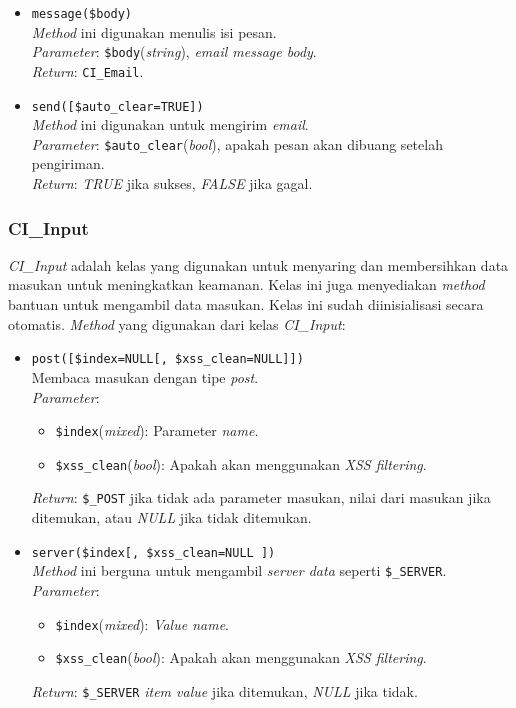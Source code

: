 \begin{itemize}
	\item \texttt{message(\$body)} \\
	\textit{Method} ini digunakan menulis isi pesan. \\
	\textit{Parameter}: \texttt{\$body}(\textit{string}), \textit{email message body}. \\
	\textit{Return}: \texttt{CI\_Email}.
	
	\item \texttt{send([\$auto\_clear=TRUE])} \\
	\textit{Method} ini digunakan untuk mengirim \textit{email}. \\
	\textit{Parameter}: \texttt{\$auto\_clear}(\textit{bool}), apakah pesan akan dibuang setelah pengiriman. \\
	\textit{Return}: \textit{TRUE} jika sukses, \textit{FALSE} jika gagal.
	
	
\end{itemize}

\subsubsection{CI\_Input}
\textit{CI\_Input} adalah kelas yang digunakan untuk menyaring dan membersihkan data masukan untuk meningkatkan keamanan. Kelas ini juga menyediakan \textit{method} bantuan untuk mengambil data masukan. Kelas ini sudah diinisialisasi secara otomatis. \textit{Method} yang digunakan dari kelas \textit{CI\_Input}:
\begin{itemize}
	\item \texttt{post([\$index=NULL[, \$xss\_clean=NULL]])} \\
	Membaca masukan dengan tipe \textit{post}. \\
	\textit{Parameter}:
	\begin{itemize}
		\item \texttt{\$index}(\textit{mixed}): Parameter \textit{name}.
		\item \texttt{\$xss\_clean}(\textit{bool}): Apakah akan menggunakan \textit{XSS filtering}.
	\end{itemize}
	\textit{Return}: \texttt{\$\_POST} jika tidak ada parameter masukan, nilai dari masukan jika ditemukan, atau \textit{NULL} jika tidak ditemukan.
	
	\item \texttt{server(\$index[, \$xss\_clean=NULL ])} \\ 
	\textit{Method} ini berguna untuk mengambil \textit{server data} seperti \texttt{\$\_SERVER}. \\
	\textit{Parameter}:
	\begin{itemize}
		\item \texttt{\$index}(\textit{mixed}): \textit{Value name}. 
		\item \texttt{\$xss\_clean}(\textit{bool}): Apakah akan menggunakan \textit{XSS filtering}.
	\end{itemize}
	\textit{Return}: \texttt{\$\_SERVER} \textit{item value} jika ditemukan, \textit{NULL} jika tidak.
	
\end{itemize}

